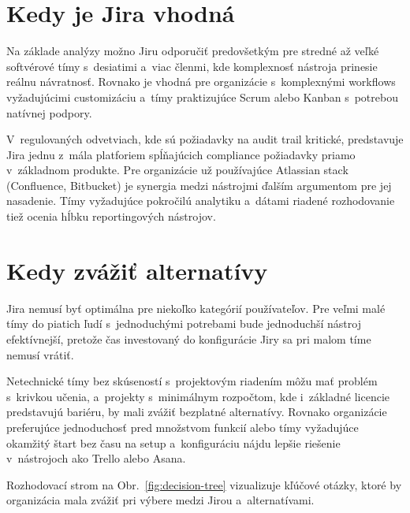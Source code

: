 \section{Kedy je Jira vhodná}

Na základe analýzy možno Jiru odporučiť predovšetkým pre stredné až veľké softvérové tímy s~desiatimi a~viac členmi, kde komplexnosť nástroja prinesie reálnu návratnosť. Rovnako je vhodná pre organizácie s~komplexnými workflows vyžadujúcimi customizáciu a~tímy praktizujúce Scrum alebo Kanban s~potrebou natívnej podpory.

V~regulovaných odvetviach, kde sú požiadavky na audit trail kritické, predstavuje Jira jednu z~mála platforiem spĺňajúcich compliance požiadavky priamo v~základnom produkte. Pre organizácie už používajúce Atlassian stack (Confluence, Bitbucket) je synergia medzi nástrojmi ďalším argumentom pre jej nasadenie. Tímy vyžadujúce pokročilú analytiku a~dátami riadené rozhodovanie tiež ocenia hĺbku reportingových nástrojov.

\section{Kedy zvážiť alternatívy}

Jira nemusí byť optimálna pre niekoľko kategórií používateľov. Pre veľmi malé tímy do piatich ľudí s~jednoduchými potrebami bude jednoduchší nástroj efektívnejší, pretože čas investovaný do konfigurácie Jiry sa pri malom tíme nemusí vrátiť.

Netechnické tímy bez skúseností s~projektovým riadením môžu mať problém s~krivkou učenia, a~projekty s~minimálnym rozpočtom, kde i~základné licencie predstavujú bariéru, by mali zvážiť bezplatné alternatívy. Rovnako organizácie preferujúce jednoduchosť pred množstvom funkcií alebo tímy vyžadujúce okamžitý štart bez času na setup a~konfiguráciu nájdu lepšie riešenie v~nástrojoch ako Trello alebo Asana.

Rozhodovací strom na Obr.~\ref{fig:decision-tree} vizualizuje kľúčové otázky, ktoré by organizácia mala zvážiť pri výbere medzi Jirou a~alternatívami.

